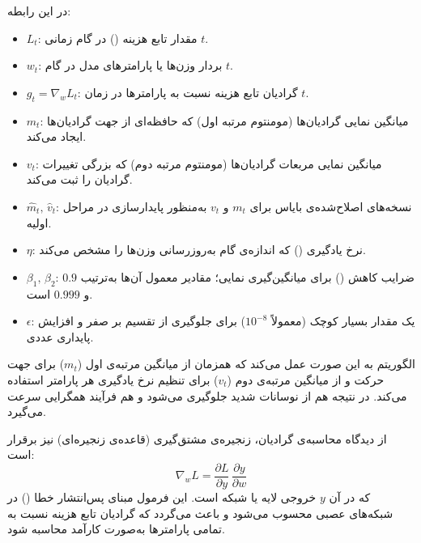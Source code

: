 در این رابطه:
\begin{itemize}
	\item $L_t$: مقدار تابع هزینه () در گام زمانی $t$.
	\item $w_t$: بردار وزن‌ها یا پارامترهای مدل در گام $t$.
	\item $g_t = \nabla_{\!w} L_t$: گرادیان تابع هزینه نسبت به پارامترها در زمان $t$.
	\item $m_t$: میانگین نمایی گرادیان‌ها (مومنتوم مرتبه اول) که حافظه‌ای از جهت گرادیان‌ها ایجاد می‌کند.
	\item $v_t$: میانگین نمایی مربعات گرادیان‌ها (مومنتوم مرتبه دوم) که بزرگی تغییرات گرادیان را ثبت می‌کند.
	\item $\hat{m}_t,\,\hat{v}_t$: نسخه‌های اصلاح‌شده‌ی بایاس برای $m_t$ و $v_t$ به‌منظور پایدارسازی در مراحل اولیه.
	\item $\eta$: نرخ یادگیری () که اندازه‌ی گام به‌روزرسانی وزن‌ها را مشخص می‌کند.
	\item $\beta_1,\,\beta_2$: ضرایب کاهش () برای میانگین‌گیری نمایی؛ مقادیر معمول آن‌ها به‌ترتیب $0.9$ و $0.999$ است.
	\item $\epsilon$: یک مقدار بسیار کوچک (معمولاً $10^{-8}$) برای جلوگیری از تقسیم بر صفر و افزایش پایداری عددی.
\end{itemize}

الگوریتم  به این صورت عمل می‌کند که همزمان از میانگین مرتبه‌ی اول ($m_t$) برای جهت حرکت و از میانگین مرتبه‌ی دوم ($v_t$) برای تنظیم نرخ یادگیری هر پارامتر استفاده می‌کند. در نتیجه هم از نوسانات شدید جلوگیری می‌شود و هم فرآیند همگرایی سرعت می‌گیرد.  

از دیدگاه محاسبه‌ی گرادیان، زنجیره‌ی مشتق‌گیری (قاعده‌ی زنجیره‌ای) نیز برقرار است:
\begin{equation}
	\nabla_{\!w} L = \frac{\partial L}{\partial y}\,\frac{\partial y}{\partial w}
\end{equation}
که در آن $y$ خروجی لایه یا شبکه است. این فرمول مبنای پس‌انتشار خطا () در شبکه‌های عصبی محسوب می‌شود و باعث می‌گردد که گرادیان تابع هزینه نسبت به تمامی پارامترها به‌صورت کارآمد محاسبه شود.

